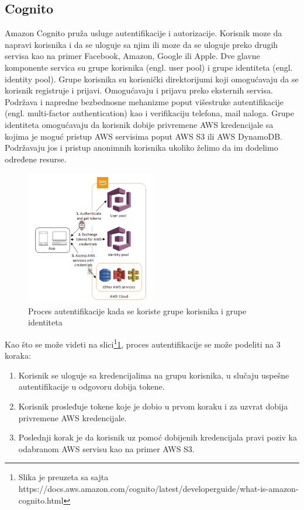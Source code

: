 \documentclass[12pt,oneside]{memoir}
\begin{document}
\subsection{Cognito}
 
Amazon Cognito pruža usluge autentifikacije i autorizacije. Korisnik moze da napravi korisnika i da se uloguje sa njim ili moze da se uloguje preko drugih servisa kao na primer Facebook, Amazon, Google ili Apple. Dve glavne komponente servica su grupe korisnika (engl. user pool) i grupe identiteta (engl. identity pool). Grupe korisnika su korisnički direktorijumi koji omogućavaju da se korisnik registruje i prijavi. Omogućavaju i prijavu preko eksternih servisa. Podržava i napredne bezbednosne mehanizme poput višestruke autentifikacije (engl. multi-factor authentication) kao i verifikaciju telefona, mail naloga. Grupe identiteta omogućavaju da korisnik dobije privremene AWS kredencijale sa kojima je moguć pristup AWS servisima poput AWS S3 ili AWS DynamoDB. Podržavaju jos i pristup anonimnih korisnika ukoliko želimo da im dodelimo određene resurse.


\begin{figure}[!ht]
  \centering
  \includegraphics[width=0.5\textwidth]{ProcesAutentifikacije.png}
  \caption{Proces autentifikacije kada se koriste grupe korisnika i grupe identiteta}
  \label{fig:procesAutentifikacije}
\end{figure}

Kao što se može videti na slici\footnote{Slika je preuzeta sa sajta https://docs.aws.amazon.com/cognito/latest/developerguide/what-is-amazon-cognito.html}\ref{fig:procesAutentifikacije}, proces autentifikacije se može podeliti na 3 koraka:
\begin{enumerate}
  \item Korisnik se uloguje sa kredencijalima na grupu korisnika, u slučaju uspešne autentifikacije u odgovoru dobija tokene.
  \item Korisnik prosleđuje tokene koje je dobio u prvom koraku i za uzvrat dobija privremene AWS kredencijale.
  \item Poslednji korak je da korisnik uz pomoć dobijenih kredencijala pravi poziv ka odabranom AWS servisu kao na primer AWS S3.
\end{enumerate}
\end{document}
